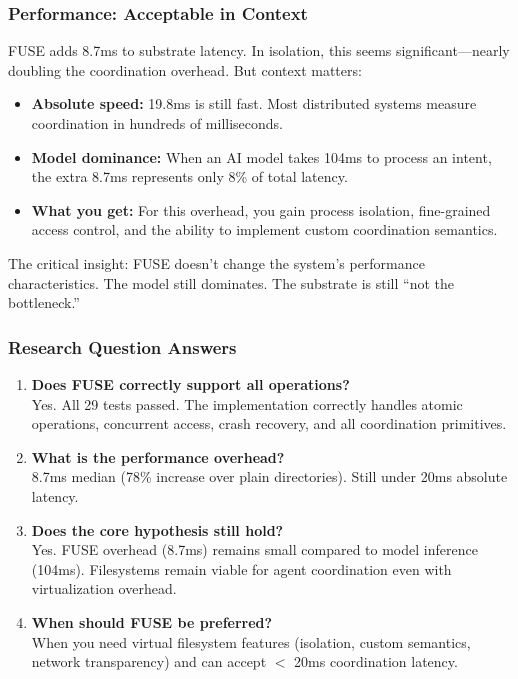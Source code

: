 \documentclass[11pt]{article}
\begin{document}
\subsubsection{Performance: Acceptable in Context}

FUSE adds 8.7ms to substrate latency. In isolation, this seems significant---nearly doubling the coordination overhead. But context matters:

\begin{itemize}
\item \textbf{Absolute speed:} 19.8ms is still fast. Most distributed systems measure coordination in hundreds of milliseconds.
\item \textbf{Model dominance:} When an AI model takes 104ms to process an intent, the extra 8.7ms represents only 8\% of total latency.
\item \textbf{What you get:} For this overhead, you gain process isolation, fine-grained access control, and the ability to implement custom coordination semantics.
\end{itemize}

The critical insight: FUSE doesn't change the system's performance characteristics. The model still dominates. The substrate is still ``not the bottleneck.''

\subsubsection{Research Question Answers}

\begin{enumerate}
\item \textbf{Does FUSE correctly support all operations?}\\
  Yes. All 29 tests passed. The implementation correctly handles atomic operations, concurrent access, crash recovery, and all coordination primitives.

\item \textbf{What is the performance overhead?}\\
  8.7ms median (78\% increase over plain directories). Still under 20ms absolute latency.

\item \textbf{Does the core hypothesis still hold?}\\
  Yes. FUSE overhead (8.7ms) remains small compared to model inference (104ms). Filesystems remain viable for agent coordination even with virtualization overhead.

\item \textbf{When should FUSE be preferred?}\\
  When you need virtual filesystem features (isolation, custom semantics, network transparency) and can accept $<$ 20ms coordination latency.
\end{enumerate}
\end{document}
